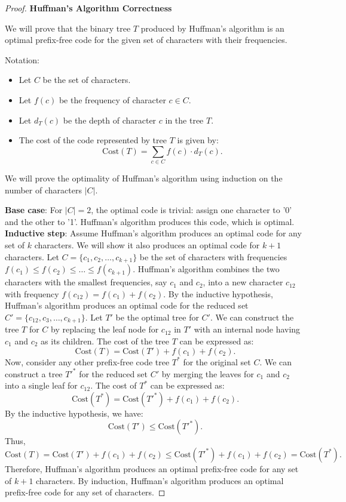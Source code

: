 \documentclass[oneside]{book}
\begin{document}
\begin{proof}
\textbf{Huffman's Algorithm Correctness}

We will prove that the binary tree $T$ produced by Huffman's algorithm is an optimal prefix-free code for the given set of characters with their frequencies.

Notation:
\begin{itemize}
    \item Let $C$ be the set of characters.
    \item Let $f(c)$ be the frequency of character $c \in C$.
    \item Let $d_T(c)$ be the depth of character $c$ in the tree $T$.
    \item The cost of the code represented by tree $T$ is given by:
    \[
    \text{Cost}(T) = \sum_{c \in C} f(c) \cdot d_T(c).
    \]
\end{itemize}

We will prove the optimality of Huffman's algorithm using induction on the number of characters $|C|$.

\textbf{Base case}: For $|C| = 2$, the optimal code is trivial: assign one character to '0' and the other to '1'. Huffman's algorithm produces this code, which is optimal.
\textbf{Inductive step}: Assume Huffman's algorithm produces an optimal code for any set of $k$ characters. We will show it also produces an optimal code for $k+1$ characters.
Let $C = \{c_1, c_2, \ldots, c_{k+1}\}$ be the set of characters with frequencies $f(c_1) \leq f(c_2) \leq \ldots \leq f(c_{k+1})$.
Huffman's algorithm combines the two characters with the smallest frequencies, say $c_1$ and $c_2$, into a new character $c_{12}$ with frequency $f(c_{12}) = f(c_1) + f(c_2)$.
By the inductive hypothesis, Huffman's algorithm produces an optimal code for the reduced set $C' = \{c_{12}, c_3, \ldots, c_{k+1}\}$.
Let $T'$ be the optimal tree for $C'$. We can construct the tree $T$ for $C$ by replacing the leaf node for $c_{12}$ in $T'$ with an internal node having $c_1$ and $c_2$ as its children.
The cost of the tree $T$ can be expressed as:
\[\text{Cost}(T) = \text{Cost}(T') + f(c_1) + f(c_2).\]
Now, consider any other prefix-free code tree $T^*$ for the original set $C$. We can construct a tree $T'^*$ for the reduced set $C'$ by merging the leaves for $c_1$ and $c_2$ into a single leaf for $c_{12}$. The cost of $T^*$ can be expressed as:
\[\text{Cost}(T^*) = \text{Cost}(T'^*) + f(c_1) + f(c_2).\]
By the inductive hypothesis, we have:
\[\text{Cost}(T') \leq \text{Cost}(T'^*).\]
Thus,
\[\text{Cost}(T) = \text{Cost}(T') + f(c_1) + f(c_2) \leq \text{Cost}(T'^*) + f(c_1) + f(c_2) = \text{Cost}(T^*).\]
Therefore, Huffman's algorithm produces an optimal prefix-free code for any set of $k+1$ characters.
By induction, Huffman's algorithm produces an optimal prefix-free code for any set of characters.

\end{proof}
\end{document}
